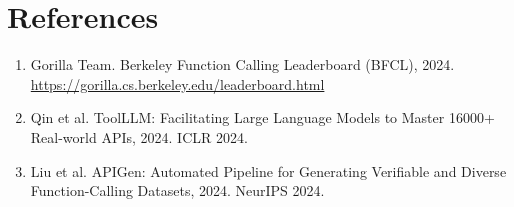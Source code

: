 \documentclass{article}
\begin{document}
\section*{References}
\small
\begin{enumerate}
    \item Gorilla Team. Berkeley Function Calling Leaderboard (BFCL), 2024. \url{https://gorilla.cs.berkeley.edu/leaderboard.html}
    \item Qin et al. ToolLLM: Facilitating Large Language Models to Master 16000+ Real-world APIs, 2024. ICLR 2024.
    \item Liu et al. APIGen: Automated Pipeline for Generating Verifiable and Diverse Function-Calling Datasets, 2024. NeurIPS 2024.
\end{enumerate}
\end{document}
